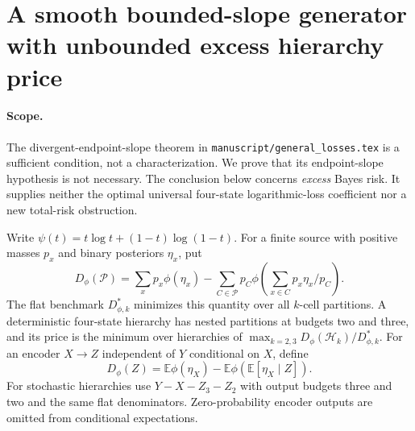 \section{A smooth bounded-slope generator with unbounded excess hierarchy price}
\label{sec:smooth-counterexample}

\paragraph{Scope.}
The divergent-endpoint-slope theorem in \texttt{manuscript/general\_losses.tex}
is a sufficient condition, not a characterization.  We prove that its
endpoint-slope hypothesis is not necessary.  The conclusion below concerns
\emph{excess} Bayes risk.  It supplies neither the optimal universal
four-state logarithmic-loss coefficient nor a new total-risk obstruction.

Write $\psi(t)=t\log t+(1-t)\log(1-t)$.  For a finite source with positive
masses $p_x$ and binary posteriors $\eta_x$, put
\[
 D_\phi(\mathcal P)=\sum_xp_x\phi(\eta_x)
 -\sum_{C\in\mathcal P}p_C\phi\left(\sum_{x\in C}p_x\eta_x/p_C\right).
\]
The flat benchmark $D_{\phi,k}^*$ minimizes this quantity over all
$k$-cell partitions.  A deterministic four-state hierarchy has nested
partitions at budgets two and three, and its price is the minimum over
hierarchies of $\max_{k=2,3}D_\phi(\mathcal H_k)/D_{\phi,k}^*$.
For an encoder $X\to Z$ independent of $Y$ conditional on $X$, define
\[
 D_\phi(Z)=\mathbb E\phi(\eta_X)
             -\mathbb E\phi(\mathbb E[\eta_X\mid Z]).
\]
For stochastic hierarchies use $Y-X-Z_3-Z_2$ with output budgets three
and two and the same flat denominators.  Zero-probability encoder outputs
are omitted from conditional expectations.

